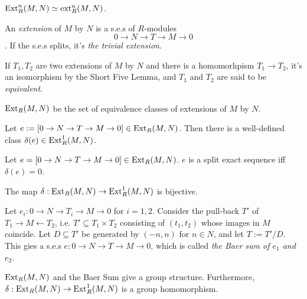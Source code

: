 \documentclass{article}
\begin{document}
\begin{theorem}
  \(\textnormal{Ext}_R^n(M, N) \simeq \textnormal{ext}_R^n(M, N)\).
\end{theorem}

\begin{definition}
  An \emph{extension} of \(M\) by \(N\) is a s.e.s of \(R\)-modules
  \[0 \to N \to T \to M \to 0\].
  If the s.e.s splits, it's \emph{the trivial extension}.
\end{definition}

\begin{definition}
  If \(T_1, T_2\) are two extensions of \(M\) by \(N\)
  and there is a homomorhpism \(T_1 \to T_2\),
  it's an isomorphism by the Short Five Lemma,
  and \(T_1\) and \(T_2\) are said to be \emph{equivalent}.
\end{definition}

\begin{definition}
  \(\textnormal{Ext}_R(M, N)\) be the set of equivalence classes of extensions of \(M\) by \(N\).
\end{definition}

\begin{lemma}
  Let \(e := [0 \to N \to T \to M \to 0] \in \textnormal{Ext}_R(M, N)\).
  Then there is a well-defined class \(\delta(e) \in \textnormal{Ext}_R^1(M, N)\).
\end{lemma}

\begin{lemma}
  Let \(e = [0 \to N \to T \to M \to 0] \in \textnormal{Ext}_R(M, N)\).
  \(e\) is a split exact sequence iff \(\delta(e) = 0\).
\end{lemma}

\begin{theorem}
  The map \(\delta: \textnormal{Ext}_R(M, N) \to \textnormal{Ext}_R^1(M, N)\) is bijective.
\end{theorem}

\begin{definition}
  Let \(e_i: 0 \to N \to T_i \to M \to 0\) for \(i = 1, 2\).
  Consider the pull-back \(T'\) of \(T_1 \to M \leftarrow T_2\),
  i.e. \(T' \subseteq T_1 \times T_2\)
  consisting of \((t_1, t_2)\) whose images in \(M\) coincide.
  Let \(D \subseteq T'\)
  be generated by \((-n, n)\) for \(n \in N\),
  and let \(T := T'/D\).
  This gies a s.e.s \(e: 0 \to N \to T \to M \to 0\),
  which is called \emph{the Baer sum of \(e_1\) and \(e_2\)}.
\end{definition}

\begin{theorem}
  \(\textnormal{Ext}_R(M, N)\) and the Baer Sum give a group structure.
  Furthermore, \(\delta: \textnormal{Ext}_R(M, N) \to \textnormal{Ext}_R^1(M, N)\)
  is a group homomorphism.
\end{theorem}
\end{document}

